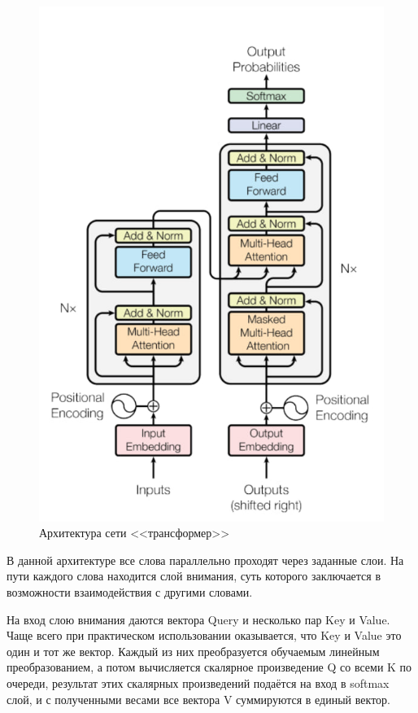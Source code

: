 \begin{figure}[h!] 
	\center
	\includegraphics [scale=0.6] {my_folder/images/transformer}
	\caption{Архитектура сети <<трансформер>>} 
	\label{fig:transformer}
\end{figure}

В данной архитектуре все слова параллельно проходят через заданные слои. На пути каждого слова находится слой внимания, суть которого заключается в возможности взаимодействия с другими словами.

На вход слою внимания даются вектора Query и несколько пар Key и Value.  Чаще всего при практическом использовании оказывается, что  Key и Value это один и тот же вектор. Каждый из них преобразуется обучаемым линейным преобразованием, а потом вычисляется скалярное произведение Q со всеми K по очереди, результат этих скалярных произведений подаётся на вход в softmax слой, и с полученными весами все вектора V суммируются в единый вектор. 

